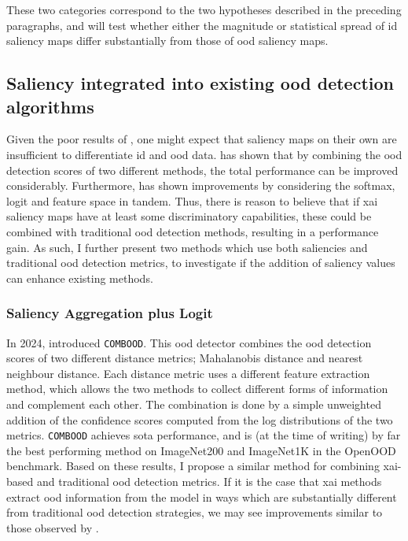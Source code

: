 \documentclass[UKenglish]{uiomasterthesis} %
\theoremstyle{definition}
\begin{document}
These two categories correspond to the two hypotheses described in the preceding paragraphs, and will test whether either the magnitude or statistical spread of \ac{id} saliency maps differ substantially from those of \ac{ood} saliency maps.

\subsection{Saliency integrated into existing \ac{ood} detection algorithms}

Given the poor results of \cite{martinez}, one might expect that saliency maps on their own are insufficient to differentiate \ac{id} and \ac{ood} data. \cite{combood} has shown that by combining the \ac{ood} detection scores of two different methods, the total performance can be improved considerably. Furthermore, \cite{vim} has shown improvements by considering the softmax, logit and feature space in tandem. Thus, there is reason to believe that if \ac{xai} saliency maps have at least some discriminatory capabilities, these could be combined with traditional \ac{ood} detection methods, resulting in a performance gain. As such, I further present two methods which use both saliencies and traditional \ac{ood} detection metrics, to investigate if the addition of saliency values can enhance existing methods.

\subsubsection{ Saliency Aggregation plus Logit} \label{section:salpluslogitmethod}

In 2024, \cite{combood} introduced \texttt{COMBOOD}. This \ac{ood} detector combines the \ac{ood} detection scores of two different distance metrics; Mahalanobis distance and nearest neighbour distance. Each distance metric uses a different feature extraction method, which allows the two methods to collect different forms of information and complement each other. The combination is done by a simple unweighted addition of the confidence scores computed from the log distributions of the two metrics. \texttt{COMBOOD} achieves \ac{sota} performance, and is (at the time of writing) by far the best performing method on ImageNet200 and ImageNet1K in the OpenOOD benchmark. Based on these results, I propose a similar method for combining \ac{xai}-based and traditional \ac{ood} detection metrics. If it is the case that \ac{xai} methods extract \ac{ood} information from the model in ways which are substantially different from traditional \ac{ood} detection strategies, we may see improvements similar to those observed by \cite{combood}.
\end{document}
